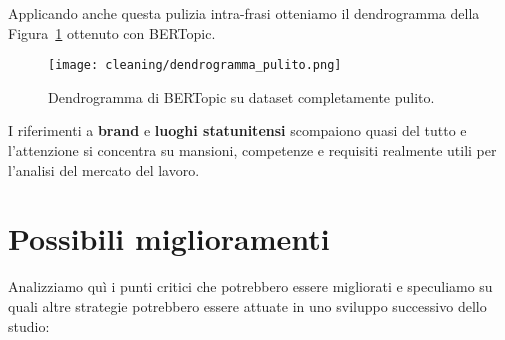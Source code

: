 \noindent Applicando anche questa pulizia intra-frasi otteniamo il dendrogramma della Figura~\ref{fig:cleaned-dendrogram} ottenuto con BERTopic.

\begin{figure}[H]
    \centering
    \texttt{[image: cleaning/dendrogramma\_pulito.png]}
    \caption{Dendrogramma di BERTopic su dataset completamente pulito.}
    \label{fig:cleaned-dendrogram}
\end{figure}

\noindent I riferimenti a \textbf{brand} e \textbf{luoghi statunitensi} scompaiono quasi del tutto e l'attenzione si concentra su mansioni, competenze e requisiti realmente utili per l'analisi del mercato del lavoro.
\section{Possibili miglioramenti}
Analizziamo quì i punti critici che potrebbero essere migliorati e speculiamo su quali altre strategie potrebbero essere attuate in uno sviluppo successivo dello studio:

